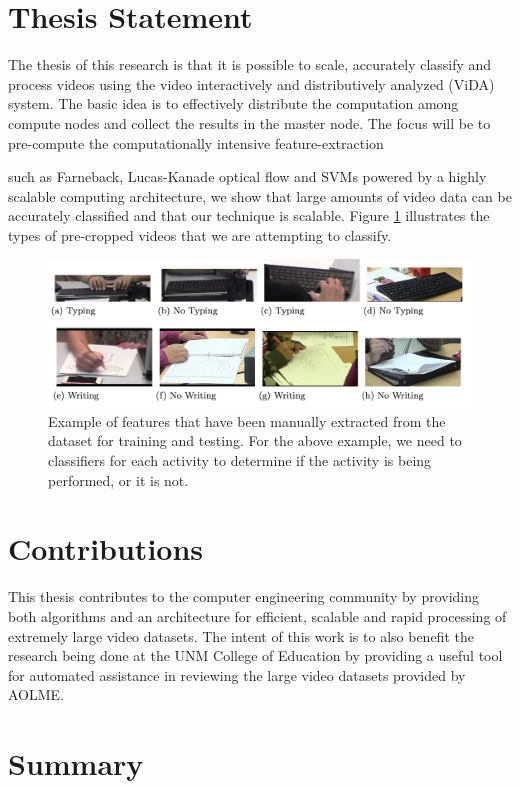 \section{\label{section:thesis_statement}Thesis Statement}
The thesis of this research is that it is possible to scale, accurately
  classify and process videos using
  the video interactively and distributively analyzed (ViDA) system.
The basic idea is to effectively distribute the computation among
  compute nodes and collect the results in the master node.
The focus will be to pre-compute the computationally intensive
  feature-extraction
   
  
such as Farneback, Lucas-Kanade optical flow and SVMs powered by a highly scalable
computing architecture, we show that large amounts of video data can be
accurately classified and that our technique is scalable. Figure \ref{fig:typing_writing}
illustrates the types of pre-cropped videos that we are attempting to classify.

\begin{figure}[h]
  \label{fig:typing_writing}
  \centering
  \includegraphics[width=\textwidth]{figures/typing_writing_clip}
  \caption{Example of features that have been manually extracted from the dataset
  for training and testing. For the above example, we need to classifiers for each
  activity to determine if the activity is being performed, or it is not.}
\end{figure}

\section{\label{section:contributions}Contributions}
This thesis contributes to the computer engineering community by providing both
algorithms and an architecture for efficient, scalable and rapid processing of
extremely large video datasets. The intent of this work is to also benefit
the research being done at the UNM College of Education by providing a useful
tool for automated assistance in reviewing the large video datasets provided
by AOLME.

\section{\label{section:summary}Summary}

